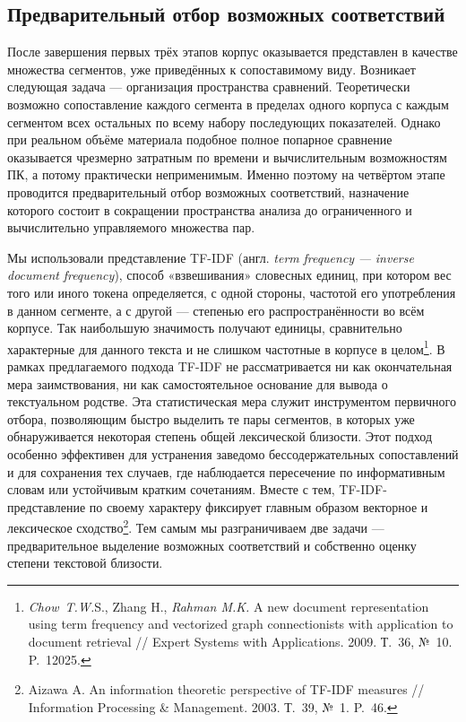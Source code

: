 \subsection{Предварительный отбор возможных соответствий}

После завершения первых трёх этапов корпус оказывается представлен в качестве множества сегментов, уже приведённых к сопоставимому виду. Возникает следующая задача --- организация пространства сравнений. Теоретически возможно сопоставление каждого сегмента в пределах одного корпуса с каждым сегментом всех остальных по всему набору последующих показателей. Однако при реальном объёме материала подобное полное попарное сравнение оказывается чрезмерно затратным по времени и вычислительным возможностям ПК, а потому практически неприменимым. Именно поэтому на четвёртом этапе проводится предварительный отбор возможных соответствий, назначение которого состоит в сокращении пространства анализа до ограниченного и вычислительно управляемого множества пар.

Мы использовали представление TF-IDF (англ. \emph{term}\emph{ }\emph{frequency}\emph{ --- }\emph{inverse}\emph{ }\emph{document}\emph{ }\emph{frequency}), способ «взвешивания» словесных единиц, при котором вес того или иного токена определяется, с одной стороны, частотой его употребления в данном сегменте, а с другой --- степенью его распространённости во всём корпусе. Так наибольшую значимость получают единицы, сравнительно характерные для данного текста и не слишком частотные в корпусе в целом\footnote{\emph{Chow~T.W.}S., Zhang H., \emph{Rahman M.K.} A new document representation using term frequency and vectorized graph connectionists with application to document retrieval // Expert Systems with Applications. 2009. Т.~36, №~10. P.~12025.}. В рамках предлагаемого подхода TF-IDF не рассматривается ни как окончательная мера заимствования, ни как самостоятельное основание для вывода о текстуальном родстве. Эта статистическая мера служит инструментом первичного отбора, позволяющим быстро выделить те пары сегментов, в которых уже обнаруживается некоторая степень общей лексической близости. Этот подход особенно эффективен для устранения заведомо бессодержательных сопоставлений и для сохранения тех случаев, где наблюдается пересечение по информативным словам или устойчивым кратким сочетаниям. Вместе с тем, TF-IDF-представление по своему характеру фиксирует главным образом векторное и лексическое сходство\footnote{Aizawa A. An information theoretic perspective of TF-IDF measures // Information Processing \& Management. 2003. Т.~39, №~1. P.~46.}. Тем самым мы разграничиваем две задачи --- предварительное выделение возможных соответствий и собственно оценку степени текстовой близости.

